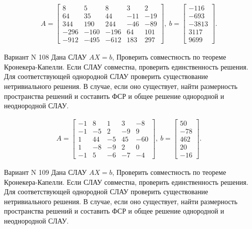 \documentclass[11pt]{report}
\begin{document}
\begin{align*}
 A = \left[\begin{matrix}8 & 5 & 8 & 3 & 2\\64 & 35 & 44 & -11 & -19\\344 & 190 & 244 & -46 & -89\\-296 & -160 & -196 & 64 & 101\\-912 & -495 & -612 & 183 & 297\end{matrix}\right],
\ b = \left[\begin{matrix}-116\\-693\\-3813\\3117\\9699\end{matrix}\right]. 
 \end{align*}

Вариант N 108
Дана СЛАУ $AX = b$,
Проверить совместность по теореме Кронекера-Капелли. Если СЛАУ совместна, проверить единственность решения.
Для соответствующей однородной СЛАУ проверить существование нетривиального решения. В случае, если оно существует,
найти размерность пространства решений и составить ФСР и общее решение однородной  и неоднородной СЛАУ.


\begin{align*}
 A = \left[\begin{matrix}-1 & 8 & 1 & 3 & -8\\-1 & -5 & 2 & -9 & 9\\1 & 44 & -5 & 45 & -60\\1 & -8 & -9 & 2 & 0\\-1 & 5 & -6 & -7 & -4\end{matrix}\right],
\ b = \left[\begin{matrix}50\\-78\\462\\20\\-16\end{matrix}\right]. 
 \end{align*}

Вариант N 109
Дана СЛАУ $AX = b$,
Проверить совместность по теореме Кронекера-Капелли. Если СЛАУ совместна, проверить единственность решения.
Для соответствующей однородной СЛАУ проверить существование нетривиального решения. В случае, если оно существует,
найти размерность пространства решений и составить ФСР и общее решение однородной  и неоднородной СЛАУ.
\end{document}
